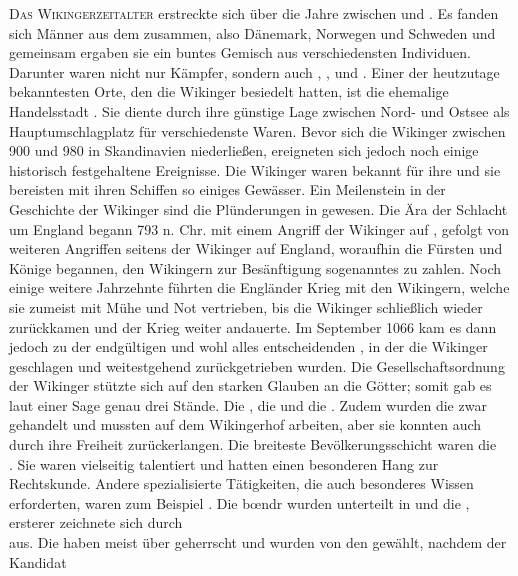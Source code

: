 \documentclass[12pt,a4paper,ngerman,openany]{book}
\newcommand{\flettrine}[2]{\lettrine[lines=2, depth=0, loversize=0.25, nindent=0.69pt, lraise=0.15]{\initfamily{#1}}{#2}}
\newcommand*\initfamily{\usefont{U}{GotIn}{xl}{n}}
\newlength{\diebox}
\newcommand{\luecke}[1]{\settowidth{\diebox}{#1}\raisebox{-1.0ex}{\parbox{2.7\diebox}{\dotfill}}}
\begin{document}
\flettrine{D}{Das Wikingerzeitalter} erstreckte sich über die Jahre zwischen \luecke{7.} und \luecke{10.}. Es fanden sich Männer aus dem \luecke{skandinav} zusammen, also Dänemark, Norwegen und Schweden und gemeinsam ergaben sie ein buntes Gemisch aus verschiedensten Individuen. Darunter waren nicht nur Kämpfer, sondern auch \luecke{Händl}, \luecke{Baue}, \luecke{Seemänn} und \luecke{Siedle}. Einer der heutzutage bekanntesten Orte, den die Wikinger besiedelt hatten, ist die ehemalige Handelsstadt \luecke{Haithabu}. Sie diente durch ihre günstige Lage zwischen Nord- und Ostsee als Hauptumschlagplatz für verschiedenste Waren.
Bevor sich die Wikinger zwischen 900 und 980 in Skandinavien niederließen, ereigneten sich jedoch noch einige historisch festgehaltene Ereignisse. Die Wikinger waren bekannt für ihre \luecke{Raubzüge} und sie bereisten mit ihren Schiffen so einiges Gewässer. Ein Meilenstein in der Geschichte der Wikinger sind die Plünderungen in \luecke{England} gewesen. Die Ära der Schlacht um England begann 793 n. Chr. mit einem Angriff der Wikinger auf \luecke{das Kloster.}, gefolgt von weiteren Angriffen seitens der Wikinger auf England, woraufhin die Fürsten und Könige begannen, den Wikingern zur Besänftigung sogenanntes \luecke{Danegeld} zu zahlen. Noch einige weitere Jahrzehnte führten die Engländer Krieg mit den Wikingern, welche sie zumeist mit Mühe und Not vertrieben, bis die Wikinger schließlich wieder zurückkamen und der Krieg weiter andauerte. Im September 1066 kam es dann jedoch zu der endgültigen und wohl alles entscheidenden \luecke{Schlacht von.}, in der die Wikinger geschlagen und weitestgehend  zurückgetrieben wurden.
Die Gesellschaftsordnung der Wikinger stützte sich auf den starken Glauben an die Götter; somit gab es laut einer Sage genau drei Stände. Die \luecke{Sklaven}, die \luecke{Freien} und die \luecke{Jarls}.
Zudem wurden die \luecke{Sklaven} zwar gehandelt und mussten auf dem Wikingerhof arbeiten, aber sie konnten auch durch \luecke{harte Arbe.} ihre Freiheit zurückerlangen.
Die breiteste Bevölkerungsschicht waren die \luecke{.....}\\
\luecke{bón}. Sie waren vielseitig talentiert und hatten einen besonderen Hang zur Rechtskunde. Andere spezialisierte Tätigkeiten, die auch besonderes Wissen erforderten, waren zum Beispiel \luecke{SchmiedArzt}. Die bœndr wurden unterteilt in \luecke{stórbœn} und die \luecke{smábœn}, ersterer zeichnete sich durch \luecke{hohes Familienansehe.}\\
\luecke{Wohlstand...} aus. Die \luecke{Könige} haben meist über \luecke{eine kleine region} geherrscht und wurden von den \luecke{stórbœndr} gewählt, nachdem der Kandidat \luecke{einen...}\\
\end{document}
